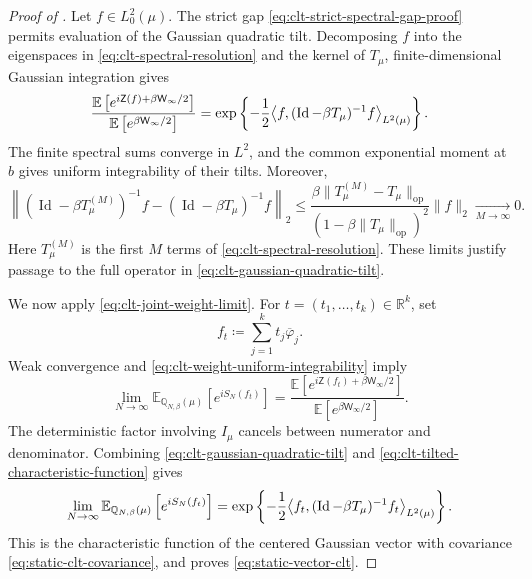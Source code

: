 \documentclass[11pt,reqno]{amsart}
\numberwithin{equation}{section}
\theoremstyle{plain}
\theoremstyle{definition}
\DeclarePairedDelimiter{\ip}{\langle}{\rangle}
\newcommand{\R}{\mathbb R}
\newcommand{\E}{\mathbb E}
\newcommand{\Q}{\mathbb Q}
\newcommand{\Id}{\operatorname{Id}}
\newcommand{\op}{\mathrm{op}}
\newcommand{\be}{\beta}
\begin{document}
\begin{proof}[Proof of ]
Let $f\in L_0^2(\mu)$.  The strict gap \eqref{eq:clt-strict-spectral-gap-proof} permits evaluation of the Gaussian quadratic tilt.  Decomposing $f$ into the eigenspaces in \eqref{eq:clt-spectral-resolution} and the kernel of $T_{\mu}$, finite-dimensional Gaussian integration gives
\begin{equation}
 \frac{\E\left[
 e^{i\mathsf Z(f)+\be\mathsf W_\infty/2}\right]}
 {\E\left[e^{\be\mathsf W_\infty/2}\right]}
 =\exp\left\{-\frac12
 \ip*{f,(\Id-\be T_{\mu})^{-1}f}_{L^2(\mu)}\right\}.
 \label{eq:clt-gaussian-quadratic-tilt}
\end{equation}
The finite spectral sums converge in $L^2$, and the common exponential moment at $b$ gives uniform integrability of their tilts. Moreover,
\begin{equation}
 \left\|(\Id-\be T_\mu^{(M)})^{-1}f
       -(\Id-\be T_\mu)^{-1}f\right\|_2
 \leq\frac{\be\|T_\mu^{(M)}-T_\mu\|_{\op}}
 {(1-\be\|T_\mu\|_{\op})^2}\|f\|_2
 \xrightarrow[M\to\infty]{}0.
 \label{eq:clt-resolvent-tail}
\end{equation}
Here $T_\mu^{(M)}$ is the first $M$ terms of \eqref{eq:clt-spectral-resolution}. These limits justify passage to the full operator in \eqref{eq:clt-gaussian-quadratic-tilt}.

We now apply \eqref{eq:clt-joint-weight-limit}.  For $t=(t_1,\ldots,t_k)\in\R^k$, set
\begin{equation}
 f_t\coloneqq\sum_{j=1}^kt_j\overline\varphi_j.
 \label{eq:clt-linear-combination}
\end{equation}
Weak convergence and \eqref{eq:clt-weight-uniform-integrability} imply
\begin{equation}
 \lim_{N\to\infty}
 \E_{\Q_{N,\be}(\mu)}
 \left[e^{iS_N(f_t)}\right]
 =\frac{\E\left[e^{i\mathsf Z(f_t)+\be\mathsf W_\infty/2}\right]}
 {\E\left[e^{\be\mathsf W_\infty/2}\right]}.
 \label{eq:clt-tilted-characteristic-function}
\end{equation}
The deterministic factor involving $I_{\mu}$ cancels between numerator and denominator.  Combining \eqref{eq:clt-gaussian-quadratic-tilt} and \eqref{eq:clt-tilted-characteristic-function} gives
\begin{equation}
 \lim_{N\to\infty}
 \E_{\Q_{N,\be}(\mu)}
 \left[e^{iS_N(f_t)}\right]
 =\exp\left\{-\frac12
 \ip*{f_t,(\Id-\be T_{\mu})^{-1}f_t}_{L^2(\mu)}\right\}.
 \label{eq:clt-limiting-characteristic-function}
\end{equation}
This is the characteristic function of the centered Gaussian vector with covariance \eqref{eq:static-clt-covariance}, and proves \eqref{eq:static-vector-clt}.


\end{proof}
\end{document}
